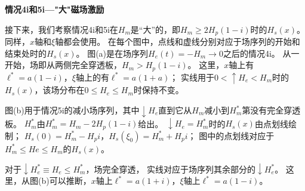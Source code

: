 \textbf{情况4i和5i---"大"磁场激励}

接下来，我们考察情况4i和5i在$H_m$是“大”的，即$H_m\ge 2H_p(1-i)$时的$H_s(x)$。
同样，$x$轴和$\xi$轴都会使用。
在每个图中，点线和虚线分别对应于场序列的开始和结束处时的$H_s(x)$。
图(a)是在场序列$H_e(t)= -H_m\rightarrow 0$之后的情况4i。
从一开始，场即从两侧完全穿透板，$H_m> H_p(1-i)$。
这里，$x$轴上有$\ell^*= a(1-i)$，$\xi$轴上的有$\ell^*= a(1+a)$；
实线用于$0 <\uparrow H_e <H_m$时的$H_s(x)$，该场分布在$0\le H_e\le H_m$时保持不变。

图(b)用于情况5i的减小场序列，其中$\downarrow H_e$直到它从$H_m$减小到$H_m^*$第没有完全穿透板。
$H_m^*$由$H_m^*= H_m -2H_p(1-i)$给出。
$\downarrow H_e = H_m^*$时的$H_s(x)$由点划线绘制；
$H_s(0)= H_m^* -H_p i$，$H_s(\xi_0)= H_m^* + H_p i$；
图中的点划线对应于$H_m^*\le He\le H_m$的$H_s(x)$。

对于$\downarrow H_e^*\equiv H_e\le H_m^*$，场完全穿透，
实线对应于场序列其余部分的$\downarrow H_e^*$。
这里，从图(b)可以推断，$x$轴上$\ell^* = a(1+i)$，$\xi$轴上$\ell^* = a(1-i)$。

